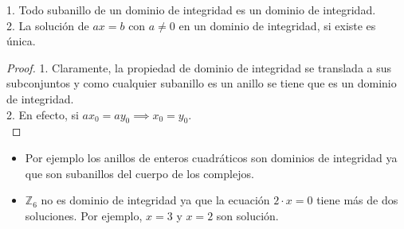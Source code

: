 \begin{proposition}
1. Todo subanillo de un dominio de integridad es un dominio de integridad.\\
2. La solución de $ax = b$ con $a \neq 0$ en un dominio de integridad, si existe es única.
\end{proposition}
\begin{proof}
	1. Claramente, la propiedad de dominio de integridad se translada a sus subconjuntos y como cualquier subanillo es un anillo se tiene que es un dominio de integridad. \\
	2. En efecto, si $ax_0 = ay_0 \implies x_0 = y_0$. \\
\end{proof}

\begin{example}
	\begin{itemize}
		\item  Por ejemplo los anillos de enteros cuadráticos son dominios de integridad ya que son subanillos del cuerpo de los complejos. 
		
		\item $\mathbb{Z}_6$ no es dominio de integridad ya que la ecuación $2 \cdot x = 0$ tiene más de dos soluciones. Por ejemplo, $x = 3$ y $x = 2$ son solución. 
	\end{itemize}
\end{example}

